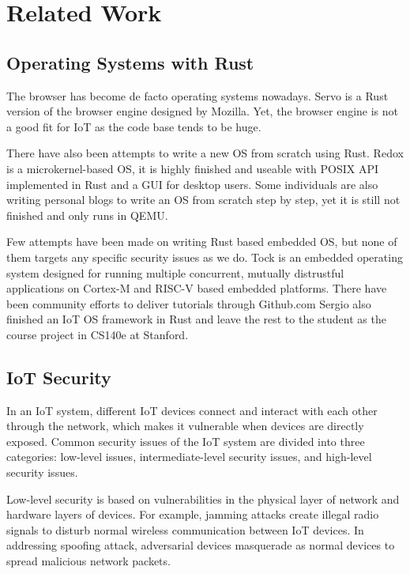 \section{Related Work}

\subsection{Operating Systems with Rust}

The browser has become de facto operating systems nowadays.
Servo\cite{Servo} is a Rust version of the browser engine designed by Mozilla.
Yet, the browser engine is not a good fit for IoT as the code base tends to be huge.

There have also been attempts to write a new OS from scratch using Rust.
Redox\cite{Redox} is a microkernel-based OS, it is highly finished and useable with POSIX API implemented in Rust and a GUI for desktop users.
Some individuals are also writing personal blogs\cite{OsPhil} to write an OS from scratch step by step, yet it is still not finished and only runs in QEMU. 

Few attempts have been made on writing Rust based embedded OS, but none of them targets any specific security issues as we do.
Tock\cite{levy2015ownership, levy2017tock, levy2017multiprogramming} is an embedded operating system designed for running multiple concurrent, mutually distrustful applications on Cortex-M and RISC-V based embedded platforms.
There have been community efforts to deliver tutorials through Github.com\cite{rpi-os-t0, rpi-os-t1}
Sergio also finished an IoT OS framework in Rust\cite{cs140e} and leave the rest to the student as the course project in CS140e at Stanford.

\subsection{IoT Security}

In an IoT system, different IoT devices connect and interact with each other through the network, which makes it vulnerable when devices are directly exposed. 
Common security issues of the IoT system are divided into three categories: low-level issues, intermediate-level security issues, and high-level security issues.

Low-level security is based on vulnerabilities in the physical layer of network and hardware layers of devices. 
For example, jamming attacks create illegal radio signals to disturb normal wireless communication between IoT devices\cite{xu2005feasibility,noubir2003low}. 
In addressing spoofing attack, adversarial devices masquerade as normal devices to spread malicious network packets\cite{chen2007detecting}.

